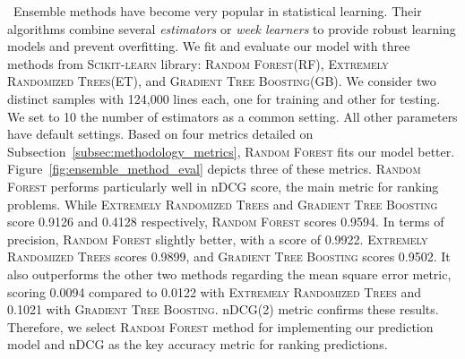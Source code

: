 \ Ensemble methods have become very popular in statistical learning. Their algorithms combine several \emph{estimators} or \emph{week learners} to provide robust learning models and prevent overfitting. We fit and evaluate our model with three methods from \textsc{Scikit-learn} library: \textsc{Random Forest}(RF), \textsc{Extremely Randomized Trees}(ET), and \textsc{Gradient Tree Boosting}(GB). We consider two distinct samples with 124,000 lines each, one for training and other for testing. We set to 10 the number of estimators as a common setting. All other parameters have default settings. Based on four metrics detailed on Subsection~\ref{subsec:methodology_metrics}, \textsc{Random Forest} fits our model better. Figure~\ref{fig:ensemble_method_eval} depicts three of these metrics. \textsc{Random Forest} performs particularly well in nDCG score, the main metric for ranking problems. While \textsc{Extremely Randomized Trees} and \textsc{Gradient Tree Boosting} score 0.9126 and 0.4128 respectively, \textsc{Random Forest} scores 0.9594. In terms of precision, \textsc{Random Forest} slightly better, with a score of 0.9922.  \textsc{Extremely Randomized Trees} scores 0.9899, and \textsc{Gradient Tree Boosting} scores 0.9502.  It also outperforms the other two methods regarding the mean square error metric, scoring 0.0094 compared to 0.0122 with \textsc{Extremely Randomized Trees} and 0.1021 with \textsc{Gradient Tree Boosting}. nDCG(2) metric confirms these results. Therefore, we select \textsc{Random Forest} method for implementing our prediction model and nDCG as the key accuracy metric for ranking predictions. 

